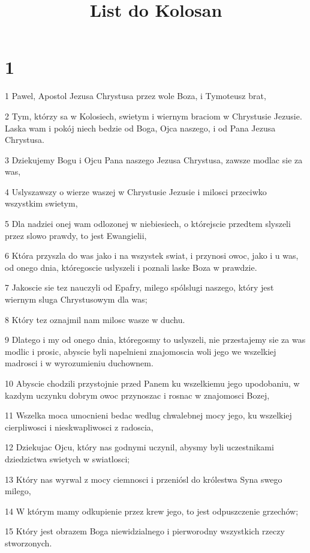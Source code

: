 

\title{List do Kolosan}


\chapter{1}

\par 1 Pawel, Apostol Jezusa Chrystusa przez wole Boza, i Tymoteusz brat,
\par 2 Tym, którzy sa w Kolosiech, swietym i wiernym braciom w Chrystusie Jezusie. Laska wam i pokój niech bedzie od Boga, Ojca naszego, i od Pana Jezusa Chrystusa.
\par 3 Dziekujemy Bogu i Ojcu Pana naszego Jezusa Chrystusa, zawsze modlac sie za was,
\par 4 Uslyszawszy o wierze waszej w Chrystusie Jezusie i milosci przeciwko wszystkim swietym,
\par 5 Dla nadziei onej wam odlozonej w niebiesiech, o którejscie przedtem slyszeli przez slowo prawdy, to jest Ewangielii,
\par 6 Która przyszla do was jako i na wszystek swiat, i przynosi owoc, jako i u was, od onego dnia, któregoscie uslyszeli i poznali laske Boza w prawdzie.
\par 7 Jakoscie sie tez nauczyli od Epafry, milego spólslugi naszego, który jest wiernym sluga Chrystusowym dla was;
\par 8 Który tez oznajmil nam milosc wasze w duchu.
\par 9 Dlatego i my od onego dnia, któregosmy to uslyszeli, nie przestajemy sie za was modlic i prosic, abyscie byli napelnieni znajomoscia woli jego we wszelkiej madrosci i w wyrozumieniu duchownem.
\par 10 Abyscie chodzili przystojnie przed Panem ku wszelkiemu jego upodobaniu, w kazdym uczynku dobrym owoc przynoszac i rosnac w znajomosci Bozej,
\par 11 Wszelka moca umocnieni bedac wedlug chwalebnej mocy jego, ku wszelkiej cierpliwosci i nieskwapliwosci z radoscia,
\par 12 Dziekujac Ojcu, który nas godnymi uczynil, abysmy byli uczestnikami dziedzictwa swietych w swiatlosci;
\par 13 Który nas wyrwal z mocy ciemnosci i przeniósl do królestwa Syna swego milego,
\par 14 W którym mamy odkupienie przez krew jego, to jest odpuszczenie grzechów;
\par 15 Który jest obrazem Boga niewidzialnego i pierworodny wszystkich rzeczy stworzonych.
